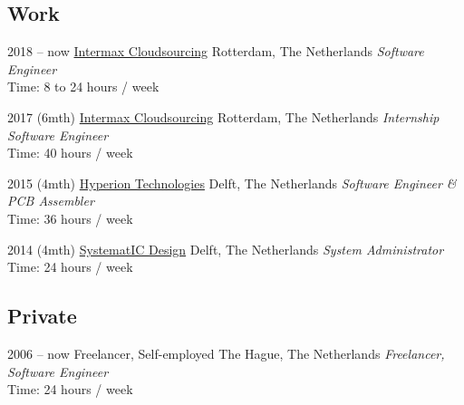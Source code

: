 \documentclass[]{friggeri-cv}
\begin{document}
\subsection{Work}

\begin{entrylist}


\entry
{2018 -- now}
{\href{https://intermax.nl/}{Intermax Cloudsourcing}}
{Rotterdam, The Netherlands}
{\emph{Software Engineer} \\
Time: 8 to 24 hours / week}


\entry
{2017 (6mth)}
{\href{https://intermax.nl/}{Intermax Cloudsourcing}}
{Rotterdam, The Netherlands}
{\emph{Internship Software Engineer} \\
Time: 40 hours / week}


\entry
{2015 (4mth)}
{\href{https://hyperiontechnologies.nl/}{Hyperion Technologies}}
{Delft, The Netherlands}
{\emph{Software Engineer \& PCB Assembler} \\
Time: 36 hours / week}


\entry
{2014 (4mth)}
{\href{https://systematic.nl/}{SystematIC Design}}
{Delft, The Netherlands}
{\emph{System Administrator} \\
Time: 24 hours / week}


\end{entrylist}

\subsection{Private}

\begin{entrylist}


\entry
{2006 -- now}
{Freelancer, Self-employed}
{The Hague, The Netherlands}
{\emph{Freelancer, Software Engineer} \\
Time: 24 hours / week}


\end{entrylist}
\end{document}
